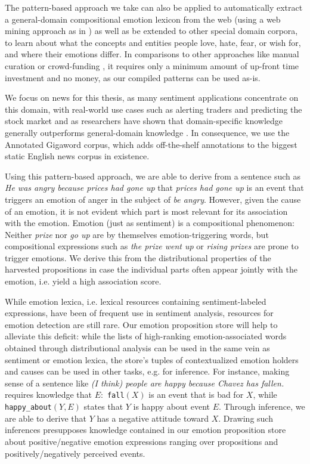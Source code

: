 The pattern-based approach we take can also be applied to automatically extract a general-domain compositional emotion lexicon from the web (using a web mining approach as in \cite{mutual_action}) as well as be extended to other special domain corpora, to learn about what the concepts and entities people love, hate, fear, or wish for, and where their emotions differ. In comparisons to other approaches like manual curation or crowd-funding \cite{nrc}, it requires only a minimum amount of up-front time investment and no money, as our compiled patterns can be used as-is.

We focus on news for this thesis, as many sentiment applications concentrate on this domain, with real-world use cases such as alerting traders and predicting the stock market \cite{predict_stock_market} and as researchers have shown that domain-specific knowledge generally outperforms general-domain knowledge \cite{implicit_emotions}. In consequence, we use the Annotated Gigaword \cite{annotated_gigaword} corpus, which adds off-the-shelf annotations to the biggest static English news corpus in existence.

Using this pattern-based approach, we are able to derive from a sentence such as \textit{He was angry because prices had gone up} that \textit{prices had gone up} is an event that triggers an emotion of anger in the subject of \textit{be angry}. However, given the cause of an emotion, it is not evident which part is most relevant for its association with the emotion. Emotion (just as sentiment) is a compositional phenomenon: Neither \textit{prize} nor \textit{go up} are by themselves emotion-triggering words, but compositional expressions such as \textit{the prize went up} or \textit{rising prizes} are prone to trigger emotions. We derive this from the distributional properties of the harvested propositions in case the individual parts often appear jointly with the emotion, i.e. yield a high association score.

While emotion lexica, i.e. lexical resources containing sentiment-labeled expressions, have been of frequent use in sentiment analysis, resources for emotion detection are still rare. Our emotion proposition store will help to alleviate this deficit: while the lists of high-ranking emotion-associated words obtained through distributional analysis can be used in the same vein as sentiment or emotion lexica, the store's tuples of contextualized emotion holders and causes can be used in other tasks, e.g. for inference. For instance, making sense of a sentence like \textit{(I think) people are happy because Chavez has fallen.} \cite{benefactive_malefactive} requires knowledge that $E:$ \texttt{fall}$(X)$ is an event that is bad for $X$, while \texttt{happy\_about}$(Y, E)$ states that $Y$ is happy about event $E$. Through inference, we are able to derive that $Y$ has a negative attitude toward $X$. Drawing such inferences presupposes knowledge contained in our emotion proposition store about positive/negative emotion expressions ranging over propositions and positively/negatively perceived events.

